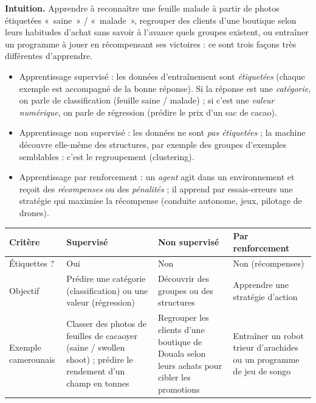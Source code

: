 \documentclass[11pt]{article}
\newcommand{\cle}[1]{{\popxbold\color{popdark}#1}}
\begin{document}
\textbf{Intuition.} Apprendre à reconnaître une feuille malade à partir de photos étiquetées «~saine~» / «~malade~», regrouper des clients d'une boutique selon leurs habitudes d'achat sans savoir à l'avance quels groupes existent, ou entraîner un programme à jouer en récompensant ses victoires : ce sont trois façons très différentes d'apprendre.

\begin{definition}
\begin{itemize}
  \item \cle{Apprentissage supervisé} : les données d'entraînement sont \emph{étiquetées} (chaque exemple est accompagné de la bonne réponse). Si la réponse est une \emph{catégorie}, on parle de \cle{classification} (feuille saine / malade) ; si c'est une \emph{valeur numérique}, on parle de \cle{régression} (prédire le prix d'un sac de cacao).
  \item \cle{Apprentissage non supervisé} : les données ne sont \emph{pas étiquetées} ; la machine découvre elle-même des structures, par exemple des groupes d'exemples semblables : c'est le \cle{regroupement} (clustering).
  \item \cle{Apprentissage par renforcement} : un \emph{agent} agit dans un environnement et reçoit des \emph{récompenses} ou des \emph{pénalités} ; il apprend par essais-erreurs une stratégie qui maximise la récompense (conduite autonome, jeux, pilotage de drones).
\end{itemize}
\end{definition}

\begin{center}
\begin{tabularx}{\linewidth}{|l|X|X|X|}
\hline
\rowcolor{popblueL} \textbf{Critère} & \textbf{Supervisé} & \textbf{Non supervisé} & \textbf{Par renforcement} \\
\hline
Étiquettes ? & Oui & Non & Non (récompenses) \\
\hline
Objectif & Prédire une catégorie (classification) ou une valeur (régression) & Découvrir des groupes ou des structures & Apprendre une stratégie d'action \\
\hline
Exemple camerounais & Classer des photos de feuilles de cacaoyer (saine / swollen shoot) ; prédire le rendement d'un champ en tonnes & Regrouper les clients d'une boutique de Douala selon leurs achats pour cibler les promotions & Entraîner un robot trieur d'arachides ou un programme de jeu de songo \\
\hline
\end{tabularx}
\end{center}
\end{document}
